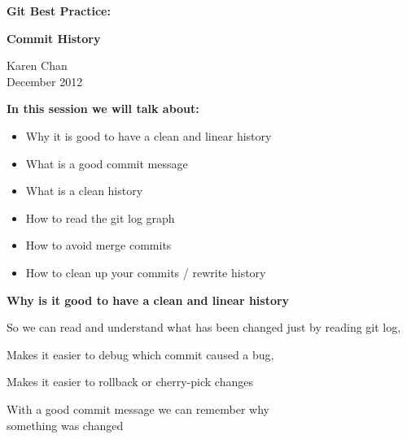 \documentclass[landscape]{slides}
\begin{document}
\begin{slide}
\begin{center}
\textbf{\huge Git Best Practice:}
\end{center}
\begin{center}
\textbf{\huge Commit History}
\end{center}
\vspace{15mm}
\begin{center}
Karen Chan\\
\vspace{10mm}
December 2012
\end{center}
\end{slide}

\begin{slide}
\textbf{In this session we will talk about:}
\begin{itemize}
\item Why it is good to have a clean and linear history
\vspace{-10mm}
\item What is a good commit message
\vspace{-10mm}
\item What is a clean history
\vspace{-10mm}
\item How to read the git log graph
\vspace{-10mm}
\item How to avoid merge commits
\vspace{-10mm}
\item How to clean up your commits / rewrite history
\end{itemize}
\end{slide}

\begin{slide}
\textbf{Why is it good to have a clean and linear history}
\begin{itemize}
{\item So we can read and understand what has been changed just by reading git log,}
\vspace{-10mm}
{\item Makes it easier to debug which commit caused a bug,}
\vspace{-10mm}
{\item Makes it easier to rollback or cherry-pick changes}
\vspace{-10mm}
{\item With a good commit message we can remember why\\ something was changed}
\end{itemize}
\end{slide}
\end{document}
